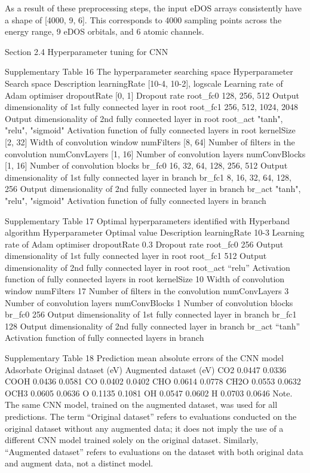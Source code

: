 As a result of these preprocessing steps, the input eDOS arrays consistently have a shape of [4000, 9, 6]. This corresponds to 4000 sampling points across the energy range, 9 eDOS orbitals, and 6 atomic channels.


Section 2.4 Hyperparameter tuning for CNN

Supplementary Table 16
The hyperparameter searching space
Hyperparameter	Search space	Description
learningRate	[10-4, 10-2], logscale	Learning rate of Adam optimiser
dropoutRate	[0, 1]	Dropout rate
root_fc0	128, 256, 512	Output dimensionality of 1st fully connected layer in root
root_fc1	256, 512, 1024, 2048	Output dimensionality of 2nd fully connected layer in root
root_act	"tanh", "relu", "sigmoid"	Activation function of fully connected layers in root
kernelSize	[2, 32]	Width of convolution window
numFilters	[8, 64]	Number of filters in the convolution
numConvLayers	[1, 16]	Number of convolution layers
numConvBlocks	[1, 16]	Number of convolution blocks
br_fc0	16, 32, 64, 128, 256, 512	Output dimensionality of 1st fully connected layer in branch
br_fc1	8, 16, 32, 64, 128, 256	Output dimensionality of 2nd fully connected layer in branch
br_act	"tanh", "relu", "sigmoid"	Activation function of fully connected layers in branch


Supplementary Table 17
Optimal hyperparameters identified with Hyperband algorithm
Hyperparameter	Optimal value	Description
learningRate	10-3	Learning rate of Adam optimiser
dropoutRate	0.3	Dropout rate
root_fc0	256	Output dimensionality of 1st fully connected layer in root
root_fc1	512	Output dimensionality of 2nd fully connected layer in root
root_act	“relu”	Activation function of fully connected layers in root
kernelSize	10	Width of convolution window
numFilters	17	Number of filters in the convolution
numConvLayers	3	Number of convolution layers
numConvBlocks	1	Number of convolution blocks
br_fc0	256	Output dimensionality of 1st fully connected layer in branch
br_fc1	128	Output dimensionality of 2nd fully connected layer in branch
br_act	“tanh”	Activation function of fully connected layers in branch


Supplementary Table 18
Prediction mean absolute errors of the CNN model
Adsorbate	Original dataset (eV)	Augmented dataset (eV)
CO2	0.0447	0.0336
COOH	0.0436	0.0581
CO	0.0402	0.0402
CHO	0.0614	0.0778
CH2O	0.0553	0.0632
OCH3	0.0605	0.0636
O	0.1135	0.1081
OH	0.0547	0.0602
H	0.0703	0.0646
Note. The same CNN model, trained on the augmented dataset, was used for all predictions. The term “Original dataset” refers to evaluations conducted on the original dataset without any augmented data; it does not imply the use of a different CNN model trained solely on the original dataset. Similarly, “Augmented dataset” refers to evaluations on the dataset with both original data and augment data, not a distinct model.


